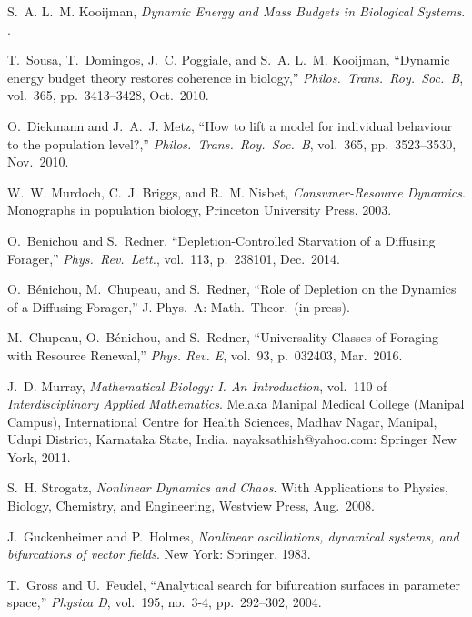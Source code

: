 \documentclass[twocolumn,preprintnumbers,amsmath,amssymb,superscriptaddress]{revtex4}
\begin{document}
{\begin{thebibliography}{10}
 S.~A. L.~M. Kooijman, {\em {Dynamic Energy and Mass
      Budgets in Biological Systems}}.  .

 T.~Sousa, T.~Domingos, J.~C. Poggiale, and
  S.~A. L.~M. Kooijman, ``{Dynamic energy budget theory restores coherence in
    biology},'' {\em Philos.\ Trans.\ Roy.\ Soc.\ B}, vol.~365,
  pp.~3413--3428, Oct.\ 2010.

 O.~Diekmann and J.~A.~J. Metz, ``{How to lift a
    model for individual behaviour to the population level?},'' {\em Philos.\
    Trans.\ Roy.\ Soc.\ B}, vol.~365, pp.~3523--3530, Nov.\ 2010.

 W.~W. Murdoch, C.~J. Briggs, and R.~M. Nisbet, {\em
    {Consumer-Resource Dynamics}}.  \newblock Monographs in population
  biology, Princeton University Press, 2003.

 O.~Benichou and S.~Redner, ``{Depletion-Controlled
    Starvation of a Diffusing Forager},'' {\em Phys.\ Rev.\ Lett.}, vol.~113,
  p.~238101, Dec.\ 2014.

 O.~B{\'e}nichou, M.~Chupeau, and S.~Redner, ``{Role
    of Depletion on the Dynamics of a Diffusing Forager},'' J. Phys.\ A:
  Math.\ Theor.\ (in press).

 M.~Chupeau, O.~B{\'e}nichou, and S.~Redner,
  ``{Universality Classes of Foraging with Resource Renewal},'' {\em
    Phys. Rev. E}, vol.~93, p.~032403, Mar.\ 2016.

 J.~D. Murray, {\em {Mathematical Biology:
      I. An Introduction}}, vol.~110 of {\em Interdisciplinary Applied
    Mathematics}.  \newblock Melaka Manipal Medical College (Manipal Campus),
  International Centre for Health Sciences, Madhav Nagar, Manipal, Udupi
  District, Karnataka State, India. nayaksathish@yahoo.com: Springer New
  York, 2011.

 S.~H. Strogatz, {\em {Nonlinear Dynamics and
      Chaos}}.  \newblock With Applications to Physics, Biology, Chemistry,
  and Engineering, Westview Press, Aug.\ 2008.

 J.~Guckenheimer and P.~Holmes, {\em {Nonlinear
      oscillations, dynamical systems, and bifurcations of vector fields}}.
  \newblock New York: Springer, 1983.

 T.~Gross and U.~Feudel, ``{Analytical search for
    bifurcation surfaces in parameter space},'' {\em Physica D}, vol.~195,
  no.~3-4, pp.~292--302, 2004.


\end{thebibliography}}
\end{document}
